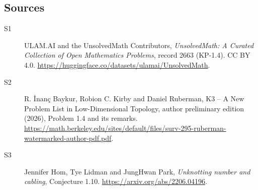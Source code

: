 \documentclass[11pt]{article}
\begin{document}
\subsection{Sources}
\begin{description}
\item[\hypertarget{source:2663:1}{S1}] ULAM.AI and the UnsolvedMath Contributors, \emph{UnsolvedMath: A Curated Collection of Open Mathematics Problems}, record 2663 (KP-1.4). CC BY 4.0. \url{https://huggingface.co/datasets/ulamai/UnsolvedMath}.
\item[\hypertarget{source:2663:2}{S2}] R. \.{I}nan\c{c} Baykur, Robion C. Kirby and Daniel Ruberman, K3 -- A New Problem List in Low-Dimensional Topology, author preliminary edition (2026), Problem 1.4 and its remarks. \url{https://math.berkeley.edu/sites/default/files/surv-295-ruberman-watermarked-author-pdf.pdf}.
\item[\hypertarget{source:2663:3}{S3}] Jennifer Hom, Tye Lidman and JungHwan Park, \emph{Unknotting number and cabling}, Conjecture 1.10. \url{https://arxiv.org/abs/2206.04196}.
\end{description}
\label{end:2663}
\end{document}
